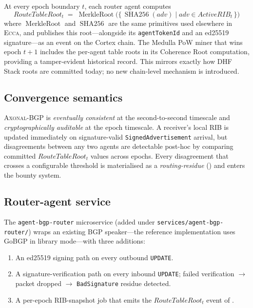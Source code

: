 \documentclass[11pt,twocolumn]{article}
\theoremstyle{definition}
\theoremstyle{plain}
\theoremstyle{remark}
\newcommand{\ecca}{\textsc{Ecca}}
\newcommand{\axonal}{\textsc{Axonal-BGP}}
\newcommand{\code}[1]{\texttt{#1}}
\DeclareMathOperator{\merkleroot}{MerkleRoot}
\DeclareMathOperator{\shatwofiftysix}{SHA256}
\begin{document}
At every epoch boundary $t$, each router agent computes
\begin{equation}\label{eq:rtroot}
\mathit{RouteTableRoot}_t \;=\; \merkleroot\bigl(\{\,\shatwofiftysix(\mathit{adv}) \mid \mathit{adv} \in \mathit{ActiveRIB}_t\,\}\bigr)
\end{equation}
\noindent where $\merkleroot$ and $\shatwofiftysix$ are the same primitives used elsewhere in \ecca{}, and publishes this root---alongside its \code{agentTokenId} and an ed25519 signature---as an event on the Cortex chain. The Medulla PoW miner that wins epoch $t+1$ includes the per-agent table roots in its Coherence Root computation, providing a tamper-evident historical record. This mirrors exactly how DHF Stack roots are committed today; no new chain-level mechanism is introduced.

\subsection{Convergence semantics}

\axonal{} is \emph{eventually consistent} at the second-to-second timescale and \emph{cryptographically auditable} at the epoch timescale. A receiver's local RIB is updated immediately on signature-valid \code{SignedAdvertisement} arrival, but disagreements between any two agents are detectable post-hoc by comparing committed $\mathit{RouteTableRoot}_t$ values across epochs. Every disagreement that crosses a configurable threshold is materialised as a \emph{routing-residue} () and enters the bounty system.

\subsection{Router-agent service}

The \code{agent-bgp-router} microservice (added under \code{services/agent-bgp-router/}) wraps an existing BGP speaker---the reference implementation uses GoBGP in library mode---with three additions:

\begin{enumerate}[leftmargin=*,itemsep=2pt]
  \item An ed25519 signing path on every outbound \code{UPDATE}.
  \item A signature-verification path on every inbound \code{UPDATE}; failed verification $\rightarrow$ packet dropped $\rightarrow$ \code{BadSignature} residue detected.
  \item A per-epoch RIB-snapshot job that emits the $\mathit{RouteTableRoot}_t$ event of .
\end{enumerate}
\end{document}
